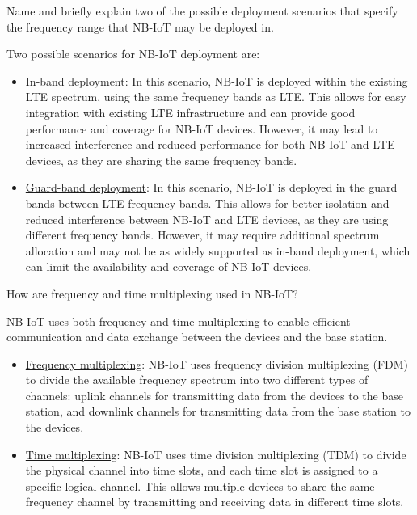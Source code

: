 \begin{ejercicio}
    Name and briefly explain two of the possible deployment scenarios that specify the frequency range that NB-IoT may be deployed in.

    Two possible scenarios for NB-IoT deployment are:
    \begin{itemize}
        \item \ul{In-band deployment}: In this scenario, NB-IoT is deployed within the existing LTE spectrum, using the same frequency bands as LTE. This allows for easy integration with existing LTE infrastructure and can provide good performance and coverage for NB-IoT devices. However, it may lead to increased interference and reduced performance for both NB-IoT and LTE devices, as they are sharing the same frequency bands.
        \item \ul{Guard-band deployment}: In this scenario, NB-IoT is deployed in the guard bands between LTE frequency bands. This allows for better isolation and reduced interference between NB-IoT and LTE devices, as they are using different frequency bands. However, it may require additional spectrum allocation and may not be as widely supported as in-band deployment, which can limit the availability and coverage of NB-IoT devices.
    \end{itemize}
\end{ejercicio}

\begin{ejercicio}
    How are frequency and time multiplexing used in NB-IoT?

    NB-IoT uses both frequency and time multiplexing to enable efficient communication and data exchange between the devices and the base station.
    \begin{itemize}
        \item \ul{Frequency multiplexing}: NB-IoT uses frequency division multiplexing (FDM) to divide the available frequency spectrum into two different types of channels: uplink channels for transmitting data from the devices to the base station, and downlink channels for transmitting data from the base station to the devices. 
        \item \ul{Time multiplexing}: NB-IoT uses time division multiplexing (TDM) to divide the physical channel into time slots, and each time slot is assigned to a specific logical channel. This allows multiple devices to share the same frequency channel by transmitting and receiving data in different time slots.
    \end{itemize}
\end{ejercicio}

